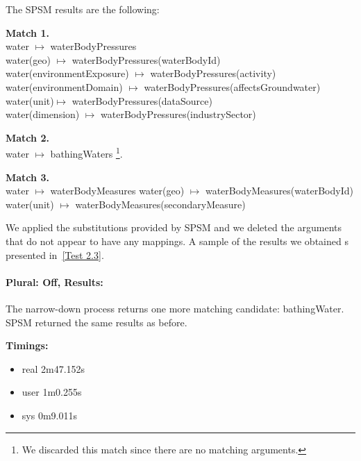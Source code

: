 \documentclass[a4paper,10pt]{article}
\begin{document}
The SPSM results are the following:

\textbf{Match 1. }\\
water $\mapsto$ waterBodyPressures\\
water(geo) $\mapsto$  waterBodyPressures(waterBodyId)\\
water(environmentExposure) $\mapsto$  waterBodyPressures(activity)\\
water(environmentDomain) $\mapsto$  waterBodyPressures(affectsGroundwater)\\
water(unit)$\mapsto$ waterBodyPressures(dataSource)\\
water(dimension) $\mapsto$ waterBodyPressures(industrySector)

\textbf{Match 2.} \\
water $\mapsto$  bathingWaters \footnote{We discarded this match since there are no matching arguments.}.

 
\textbf{Match 3.} \\
water $\mapsto$  waterBodyMeasures
water(geo) $\mapsto$ waterBodyMeasures(waterBodyId)\\
water(unit) $\mapsto$  waterBodyMeasures(secondaryMeasure)


We applied the substitutions provided by SPSM and we deleted the arguments that do not appear to have any mappings.  
A sample of the results we obtained s presented in~\ref{Test 2.3}.



\paragraph{Plural: Off, Results: } The narrow-down process returns one more matching candidate: bathingWater. SPSM returned the same results as before. 

\textbf{Timings:}
\begin{itemize}
\item real	2m47.152s
\item user	1m0.255s
\item sys	0m9.011s

\end{itemize}
\end{document}
